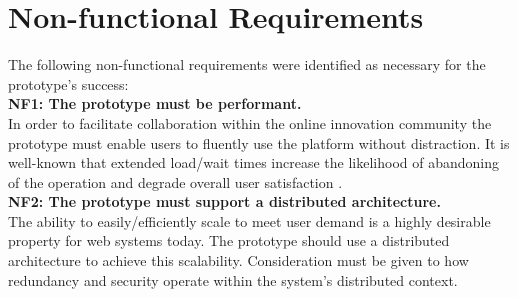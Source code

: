 \section{Non-functional Requirements}
The following non-functional requirements were identified as necessary for the prototype's success:
\newline
\\
\textbf{NF1: The prototype must be performant.}
\newline
\\
In order to facilitate collaboration within the online innovation community the prototype must enable users to fluently use the platform without distraction. It is well-known that extended load/wait times increase the likelihood of abandoning of the operation and degrade overall user satisfaction \cite{SiteSpeed1:online}\cite{TheAverage:online}\cite{HowL7:online}.
\newline
\\
\textbf{NF2: The prototype must support a distributed architecture.}
\newline
\\
The ability to easily/efficiently scale to meet user demand is a highly desirable property for web systems today. The prototype should use a distributed architecture to achieve this scalability. Consideration must be given to how redundancy and security operate within the system's distributed context.

